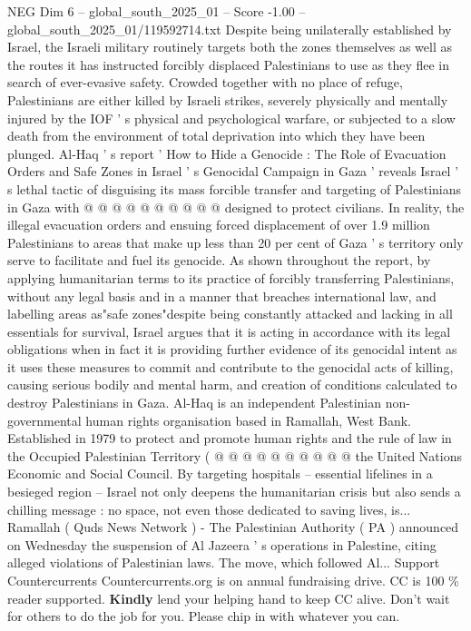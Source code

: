 \begin{textsample}{NEG Dim 6 – global\_south\_2025\_01 – Score -1.00 – global\_south\_2025\_01/119592714.txt}
Despite being unilaterally established by Israel, the Israeli military routinely targets both the zones themselves as well as the routes it has instructed forcibly displaced Palestinians to use as they flee in search of ever-evasive safety.
Crowded together with no place of refuge, Palestinians are either killed by Israeli strikes, severely physically and mentally injured by the IOF ' s physical and psychological warfare, or subjected to a slow death from the environment of total deprivation into which they have been plunged.
Al-Haq ' s report ' How to Hide a Genocide : The Role of Evacuation Orders and Safe Zones in Israel ' s Genocidal Campaign in Gaza ' reveals Israel ' s lethal tactic of disguising its mass forcible transfer and targeting of Palestinians in Gaza with @ @ @ @ @ @ @ @ @ @ designed to protect civilians.
In reality, the illegal evacuation orders and ensuing forced displacement of over 1.9 million Palestinians to areas that make up less than 20 per cent of Gaza ' s territory only serve to facilitate and fuel its genocide.
As shown throughout the report, by applying humanitarian terms to its practice of forcibly transferring Palestinians, without any legal basis and in a manner that breaches international law, and labelling areas as"safe zones"despite being constantly attacked and lacking in all essentials for survival, Israel argues that it is acting in accordance with its legal obligations when in fact it is providing further evidence of its genocidal intent as it uses these measures to commit and contribute to the genocidal acts of killing, causing serious bodily and mental harm, and creation of conditions calculated to destroy Palestinians in Gaza.
Al-Haq is an independent Palestinian non-governmental human rights organisation based in Ramallah, West Bank.
Established in 1979 to protect and promote human rights and the rule of law in the Occupied Palestinian Territory ( @ @ @ @ @ @ @ @ @ @ the United Nations Economic and Social Council.
By targeting hospitals -- essential lifelines in a besieged region -- Israel not only deepens the humanitarian crisis but also sends a chilling message : no space, not even those dedicated to saving lives, is...
Ramallah ( Quds News Network ) - The Palestinian Authority ( PA ) announced on Wednesday the suspension of Al Jazeera ' s operations in Palestine, citing alleged violations of Palestinian laws.
The move, which followed Al...
Support Countercurrents Countercurrents.org is on annual fundraising drive.
CC is 100 \% reader supported. \textbf{Kindly} lend your helping hand to keep CC alive.
Don't wait for others to do the job for you.
Please chip in with whatever you can.

\end{textsample}
